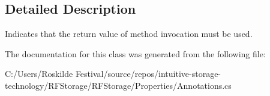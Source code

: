 \subsection{Detailed Description}
Indicates that the return value of method invocation must be used. 



The documentation for this class was generated from the following file\+:\begin{DoxyCompactItemize}
\item 
C\+:/\+Users/\+Roskilde Festival/source/repos/intuitive-\/storage-\/technology/\+R\+F\+Storage/\+R\+F\+Storage/\+Properties/Annotations.\+cs\end{DoxyCompactItemize}
